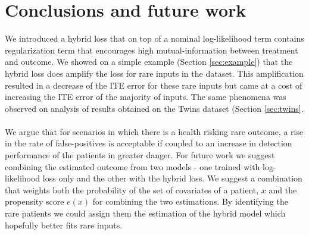 \documentclass[oneside,12pt]{article}
\begin{document}
\section{Conclusions and future work}\label{sec:goals}
%
We introduced a hybrid loss that on top of a nominal log-likelihood term contains regularization term that encourages high mutual-information between treatment and outcome. We showed on a simple example (Section \ref{sec:example}) that the hybrid loss does amplify the loss for rare inputs in the dataset. This amplification resulted in a decrease of the ITE error for these rare inputs but came at a cost of increasing the ITE error of the majority of inputs. The same phenomena was observed on analysis of results obtained on the Twins dataset (Section \ref{sec:twins}.\\\\
%
We argue that for scenarios in which there is a health risking rare outcome, a rise in the rate of false-positives is acceptable if coupled to an increase in detection performance of the patients in greater danger. 
%
For future work we suggest combining the estimated outcome from two models - one trained with log-likelihood loss only and the other with the hybrid loss. We suggest a combination that weights both the probability of the set of covariates of a patient, $x$ and the propensity score $e(x)$ for combining the two estimations. By identifying the rare patients we could assign them the estimation of the hybrid model which hopefully better fits rare inputs. 
%
%

\renewcommand{\bibname}{References}           %

%
\end{document}
